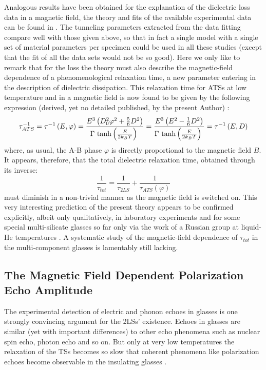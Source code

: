 \documentclass[10pt]{article}
\begin{document}
Analogous results have been obtained for the explanation of the dielectric loss 
data in a magnetic field, the theory and fits of the available experimental data can be
found in \cite{JBK2016}. The tunneling parameters extracted from the data fitting 
compare well with those given above, so that in fact a single model with a single
set of material parameters per specimen could be used in all these studies (except
that the fit of all the data sets would not be so good).
Here we only like to remark that for the loss the theory must also describe the 
magnetic-field dependence of a phenomenological relaxation time, a new parameter 
entering in the description of dielectric dissipation.
This relaxation time for ATSs at low temperature and in a magnetic field is now 
found to be given by the following expression (derived, yet no detailed published, by 
the present Author) \cite{JBK2016}:
\begin{equation}
{\tau }^{-1}_{ATS}={\tau }^{-1}\left(E,\varphi\right)=\frac{E^3\left(D^2_0\varphi^2+\frac{5}{6}D^2\right)}{{\Gamma {\rm \ tanh} \left(\frac{E}{2k_{B}T}\right)\ }}=\frac{E^3\left(E^2-\frac{1}{6}D^2\right)}{{\Gamma {\rm \ tanh} \left(\frac{E}{2k_{B}T}\right)\ }}={\tau }^{-1}\left(E,D\right)
\label{eq85}
\end{equation}
where, as usual, the A-B phase $\varphi$ is directly proportional to the magnetic 
field $B$. It appears, therefore, that the total dielectric relaxation time, 
obtained through its inverse:
\begin{equation}
\frac{1}{{\tau }_{tot}}=\frac{1}{{\tau }_{2LS}}+\frac{1}{{\tau }_{ATS}(\varphi)}
\label{eq86}
\end{equation}
must diminish in a non-trivial manner as the magnetic field is switched on. 
This very interesting prediction of the present theory appears to be confirmed 
explicitly, albeit only qualitatively, in laboratory experiments and for some special 
multi-silicate glasses so far only via the work of a Russian group at 
liquid-He temperatures \cite{Smo1979}. A systematic study of the 
magnetic-field dependence of ${\tau }_{tot}$ in the multi-component glasses is 
lamentably still lacking.

\subsection{The Magnetic Field Dependent Polarization Echo Amplitude}
The experimental detection of electric and phonon echoes in glasses is one strongly 
convincing argument for the 2LSs' existence. Echoes in glasses are similar (yet with
important differences) to other echo phenomena such as nuclear spin echo, photon 
echo and so on. But only at very low temperatures the relaxation of the TSs 
becomes so slow that coherent phenomena like polarization echoes become 
observable in the insulating glasses \cite{Phi1987}.
\end{document}
